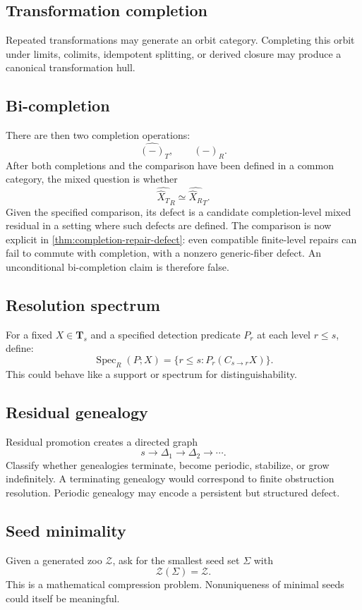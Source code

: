 \documentclass[11pt]{article}
\theoremstyle{definition}
\theoremstyle{remark}
\newcommand{\Tcat}{\mathbf T}
\newcommand{\Zoo}{\mathcal Z}
\newcommand{\Seeds}{\Sigma}
\begin{document}
\subsection{Transformation completion}
Repeated transformations may generate an orbit category. Completing this orbit under limits, colimits, idempotent splitting, or derived closure may produce a canonical transformation hull.

\subsection{Bi-completion}
There are then two completion operations:
\[
\widehat{(-)}_T,
\qquad
\widehat{(-)}_R.
\]
After both completions and the comparison have been defined in a common category, the mixed question is whether
\[
\widehat{\widehat X_T}_R
\simeq
\widehat{\widehat X_R}_T.
\]
Given the specified comparison, its defect is a candidate completion-level mixed residual in a setting where such defects are defined. The comparison is now explicit in \cref{thm:completion-repair-defect}: even compatible finite-level repairs can fail to commute with completion, with a nonzero generic-fiber defect. An unconditional bi-completion claim is therefore false.

\subsection{Resolution spectrum}
For a fixed $X\in\Tcat_s$ and a specified detection predicate $P_r$ at each level $r\le s$, define:
\[
\operatorname{Spec}_R(P;X)
=
\{r\le s:P_r(C_{s\to r}X)\}.
\]
This could behave like a support or spectrum for distinguishability.

\subsection{Residual genealogy}
Residual promotion creates a directed graph
\[
s\to\Delta_1\to\Delta_2\to\cdots.
\]
Classify whether genealogies terminate, become periodic, stabilize, or grow indefinitely. A terminating genealogy would correspond to finite obstruction resolution. Periodic genealogy may encode a persistent but structured defect.

\subsection{Seed minimality}
Given a generated zoo $\Zoo$, ask for the smallest seed set $\Seeds$ with
\[
\Zoo(\Seeds)=\Zoo.
\]
This is a mathematical compression problem. Nonuniqueness of minimal seeds could itself be meaningful.
\end{document}
